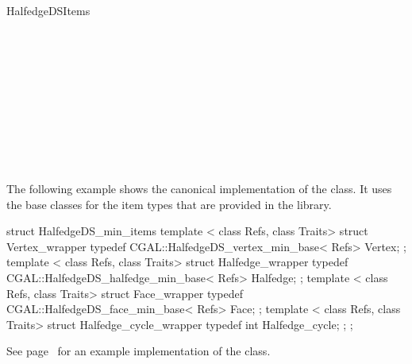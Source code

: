 \begin{ccRefConcept}{HalfedgeDSItems}
\ccSeeAlso

\\
\\
\\
\\
\\
\\
\\
\\
\\

\ccExample

The following example shows the canonical implementation of the
 class. It uses the base classes for the
item types that are provided in the library.

\begin{ccExampleCode}
struct HalfedgeDS_min_items {
    template < class Refs, class Traits>
    struct Vertex_wrapper {
        typedef CGAL::HalfedgeDS_vertex_min_base< Refs>   Vertex;
    };
    template < class Refs, class Traits>
    struct Halfedge_wrapper {
        typedef CGAL::HalfedgeDS_halfedge_min_base< Refs> Halfedge;
    };
    template < class Refs, class Traits>
    struct Face_wrapper {
        typedef CGAL::HalfedgeDS_face_min_base< Refs>     Face;
    };
    template < class Refs, class Traits>
    struct Halfedge_cycle_wrapper {
        typedef int Halfedge_cycle;
    };
};
\end{ccExampleCode}

See page~\pageref{pageHalfedgeDSitemsRef} for an example implementation 
of the  class.

\end{ccRefConcept}

\ccRefPageEnd

